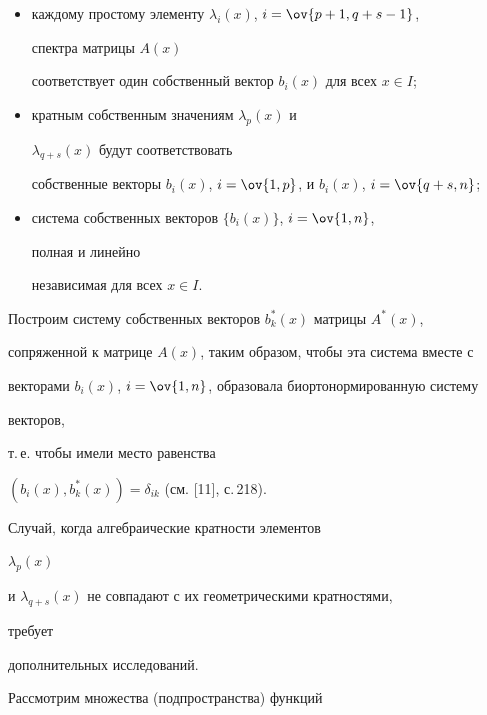 \begin{itemize} 


\item[1)] каждому простому элементу $\lambda_i(x)$, $i=\ov{p+1,q+s-1}$, 


спектра матрицы $A(x)$ 


соответствует один собственный вектор $b_i(x)$ для всех $x\in I$; 


\item[2)] кратным собственным значениям $\lambda_p(x)$ и 


$\lambda_{q+s}(x)$ будут соответствовать 


собственные векторы $b_i(x)$, $i=\ov{1,p}$, и $b_i(x)$, $i=\ov{q+s,n}$; 


\item[3)] система собственных векторов $\{b_i(x)\}$, $i=\ov{1,n}$, 


полная и линейно 


независимая для всех $x\in I$. 


\end{itemize} 


 


Построим систему собственных векторов $b^*_k(x)$ матрицы $A^*(x)$, 


сопряженной к матрице $A(x)$, таким образом, чтобы эта система вместе с 


векторами $b_i(x)$, $i=\ov{1,n}$, образовала биортонормированную систему 


векторов, 


т.\,е. чтобы имели место равенства 


$(b_i(x),b^*_k(x))=\delta_{ik}$ (см. [11], с.\,218). 


 


\begin{notenonum} Случай, когда алгебраические кратности элементов 


$\lambda_p(x)$ 


и $\lambda_{q+s}(x)$ не совпадают с их геометрическими кратностями, 


требует 


дополнительных исследований. 


\end{notenonum} 


 


Рассмотрим множества (подпространства) функций 


